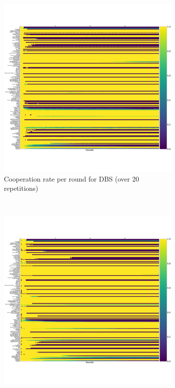 \documentclass{article}
\begin{document}
\begin{figure}[!hbtp]
    \centering
    \begin{subfigure}[t]{.3\textwidth}
        \centering
        \includegraphics[width=\textwidth]{./assets/cooperation_0_0_20_DBS_0-75_3_4_3_5_array.pdf}
        \caption{Cooperation rate per round for DBS (over 20 repetitions)}
    \end{subfigure}%
    ~
    \begin{subfigure}[t]{.3\textwidth}
        \centering
        \includegraphics[width=\textwidth]{./assets/cooperation_0_0_20_Evolved_ANN_5_Noise_05_array.pdf}

\end{subfigure}
\end{figure}
\end{document}
